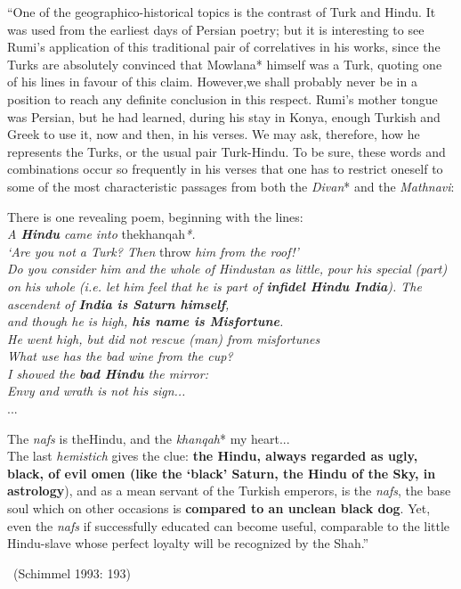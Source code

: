 \begin{myquote}
“One of the geographico-historical topics is the contrast of Turk and Hindu. It was used from the earliest days of Persian poetry; but it is interesting to see Rumi's application of this traditional pair of correlatives in his works, since the Turks are absolutely convinced that Mowlana* himself was a Turk, quoting one of his lines in favour of this claim. However,we shall probably never be in a position to reach any definite conclusion in this respect. Rumi's mother tongue was Persian, but he had learned, during his stay in Konya, enough Turkish and Greek to use it, now and then, in his verses. We may ask, therefore, how he represents the Turks, or the usual pair Turk-Hindu. To be sure, these words and combinations occur so frequently in his verses that one has to restrict oneself to some of the most characteristic passages from both the \textit{Divan}* and the \textit{Mathnavi}:
\end{myquote}

\begin{myquote}
There is one revealing poem, beginning with the lines:\\\textit{A \textbf{Hindu} came into }thekhanqah\textit{*.}\\\textit{`Are you not a Turk? Then }throw\textit{ him from the roof!'\\ Do you consider him and the whole of Hindustan as little, pour his special (part) on his whole (i.e. let him feel that he is part of \textbf{infidel Hindu India}). The ascendent of \textbf{India is Saturn himself},\\ and though he is high, \textbf{his name is Misfortune}.\\ He went high, but did not rescue (man) from misfortunes\\ What use has the bad wine from the cup?\\ I showed the \textbf{bad Hindu} the mirror:}\\\textit{Envy and wrath is not his sign...}\\...
\end{myquote}

\begin{myquote}
The \textit{nafs} is theHindu, and the \textit{khanqah}* my heart...\\ The last \textit{hemistich} gives the clue: \textbf{the Hindu, always regarded as ugly, black, of evil omen (like the `black' Saturn, the Hindu of the Sky, in astrology}), and as a mean servant of the Turkish emperors, is the \textit{nafs}, the base soul which on other occasions is \textbf{compared to an unclean black dog}. Yet, even the \textit{nafs} if successfully educated can become useful, comparable to the little Hindu-slave whose perfect loyalty will be recognized by the Shah.” 

~\hfill (Schimmel 1993: 193)
\end{myquote}

